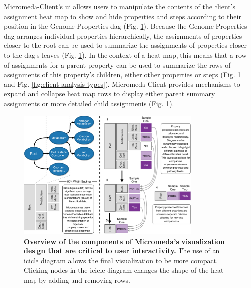 Micromeda-Client's \gls{ui} allows users to manipulate the contents of the 
client's assignment heat map to show and hide properties and steps according to 
their position in the Genome Properties \gls{dag} \cite{richardson2018genome} 
(Fig. \ref{fig:visualization-philosophy}). Because the Genome Properties 
\gls{dag} arranges individual properties hierarchically, the assignments of 
properties closer to the root can be used to summarize the assignments of 
properties closer to the \gls{dag}'s leaves (Fig. 
\ref{fig:visualization-philosophy}). In the context of a heat map, this means 
that a row of assignments for a parent property can be used to summarize the 
rows of assignments of this property's children, either other properties or 
steps (Fig. \ref{fig:visualization-philosophy} and Fig. 
\ref{fig:client-analysis-types}). Micromeda-Client provides mechanisms to expand 
and collapse heat map rows to display either parent summary assignments or more 
detailed child assignments (Fig. \ref{fig:visualization-philosophy}).

\begin{figure}[!ht]
  \centering
	\includegraphics[width=0.8\textwidth]{media/visualization_design_philosphy.pdf}
	 \caption[Overview of the components of Micromeda's visualization design that 
are critical to user interactivity.]{\textbf{Overview of the components of 
Micromeda's visualization design that are critical to user interactivity.} The 
use of an icicle diagram allows the final visualization to be more compact. 
Clicking nodes in the icicle diagram changes the shape of the heat map by adding 
and removing rows.}
	 \label{fig:visualization-philosophy}
\end{figure}

